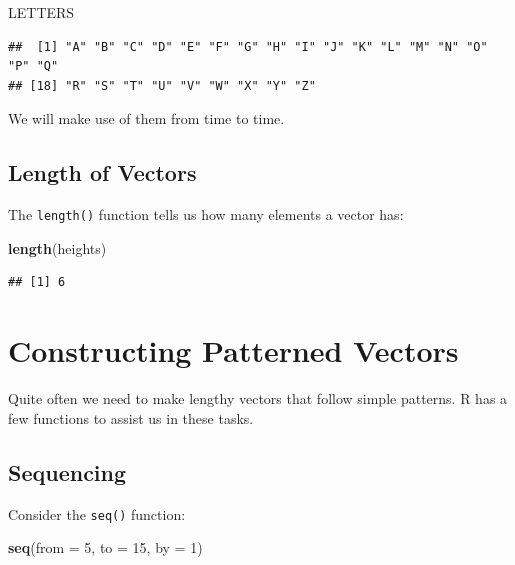 \documentclass[]{book}
\makeatletter
\newenvironment{Shaded}{\begin{snugshade}}{\end{snugshade}}
\newcommand{\KeywordTok}[1]{\textcolor[rgb]{0.13,0.29,0.53}{\textbf{{#1}}}}
\newcommand{\DataTypeTok}[1]{\textcolor[rgb]{0.13,0.29,0.53}{{#1}}}
\newcommand{\DecValTok}[1]{\textcolor[rgb]{0.00,0.00,0.81}{{#1}}}
\newcommand{\NormalTok}[1]{{#1}}
\newenvironment{kframe}{%
\medskip{}
\setlength{\fboxsep}{.8em}
 \def\at@end@of@kframe{}%
 \ifinner\ifhmode%
  \def\at@end@of@kframe{\end{minipage}}%
  \begin{minipage}{\columnwidth}%
 \fi\fi%
 \def\FrameCommand##1{\hskip\@totalleftmargin \hskip-\fboxsep
 \colorbox{shadecolor}{##1}\hskip-\fboxsep
     \hskip-\linewidth \hskip-\@totalleftmargin \hskip\columnwidth}%
 \MakeFramed {\advance\hsize-\width
   \@totalleftmargin\z@ \linewidth\hsize
   \@setminipage}}%
 {\par\unskip\endMakeFramed%
 \at@end@of@kframe}
\renewenvironment{Shaded}{\begin{kframe}}{\end{kframe}}
\theoremstyle{definition}
\theoremstyle{definition}
\theoremstyle{remark}
\makeatother
\begin{document}
\begin{Shaded}
\begin{Highlighting}[]
\NormalTok{LETTERS}
\end{Highlighting}
\end{Shaded}

\begin{verbatim}
##  [1] "A" "B" "C" "D" "E" "F" "G" "H" "I" "J" "K" "L" "M" "N" "O" "P" "Q"
## [18] "R" "S" "T" "U" "V" "W" "X" "Y" "Z"
\end{verbatim}

We will make use of them from time to
time.

\subsection{Length of Vectors}\label{length-of-vectors}

The \texttt{length()}
function tells us how many
elements a vector has:

\begin{Shaded}
\begin{Highlighting}[]
\KeywordTok{length}\NormalTok{(heights)}
\end{Highlighting}
\end{Shaded}

\begin{verbatim}
## [1] 6
\end{verbatim}

\section{Constructing Patterned
Vectors}\label{constructing-patterned-vectors}

Quite often we need to make lengthy vectors that follow simple patterns.
R has a few functions to assist us in these tasks.

\subsection{Sequencing}\label{sequencing}

Consider the \texttt{seq()}
function:

\begin{Shaded}
\begin{Highlighting}[]
\KeywordTok{seq}\NormalTok{(}\DataTypeTok{from =} \DecValTok{5}\NormalTok{, }\DataTypeTok{to =} \DecValTok{15}\NormalTok{, }\DataTypeTok{by =} \DecValTok{1}\NormalTok{)}
\end{Highlighting}
\end{Shaded}
\end{document}
